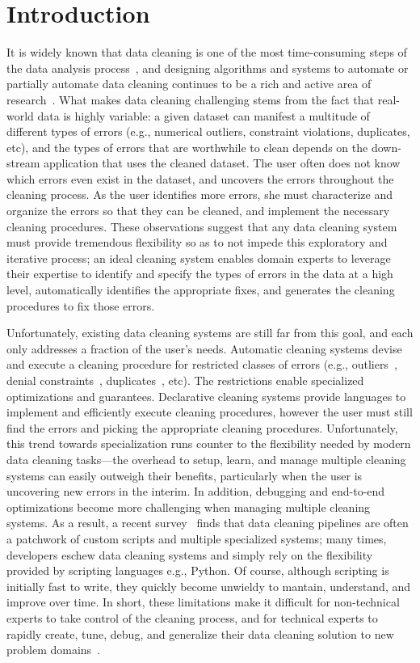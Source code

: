 \section{Introduction}\label{intro}\sloppy
It is widely known that data cleaning is one of the most time-consuming steps of the data analysis process~\cite{nytimes}, and
designing algorithms and systems to automate or partially automate data cleaning continues to be a rich and active area of research~\cite{DBLP:conf/sigmod/ChuIKW16}.
What makes data cleaning challenging stems from the fact that real-world data is highly variable: a given dataset can manifest a multitude of different types of errors (e.g., numerical outliers, constraint violations, duplicates, etc), and the types of errors that are worthwhile to clean depends on the down-stream application that uses the cleaned dataset.  The user often does not know which errors even exist in the dataset, and uncovers the errors throughout the cleaning process.
As the user identifies more errors, she must characterize and organize the errors so that they can be cleaned, and implement the necessary cleaning procedures.
These observations suggest that any data cleaning system must provide tremendous flexibility so as to not impede this exploratory and iterative process; an ideal cleaning system enables domain experts to leverage their expertise to identify and specify the types of errors in the data at a high level, automatically identifies the appropriate fixes, and generates the cleaning procedures to fix those errors.  

Unfortunately, existing data cleaning systems are still far from this goal, and each only addresses a fraction of the user's needs.
Automatic cleaning systems devise and execute a cleaning procedure for restricted classes of errors (e.g., outliers~\cite{}, denial constraints~\cite{}, duplicates~\cite{}, etc).  The restrictions enable specialized optimizations and guarantees.  
Declarative cleaning systems provide languages to implement and efficiently execute cleaning procedures, however the user must still find the errors and picking the appropriate cleaning procedures.
Unfortunately, this trend towards specialization runs counter to the flexibility needed by modern data cleaning tasks---the overhead to setup, learn, and manage multiple  cleaning systems can easily outweigh their benefits, particularly when the user is uncovering new errors in the interim.    In addition, debugging and end-to-end optimizations become more challenging when managing multiple cleaning systems.
As a result, a recent survey~\cite{krishnan2016hilda} finds that data cleaning pipelines are often a patchwork of custom scripts and multiple specialized systems; many times, developers eschew data cleaning systems and simply rely on the flexibility provided by scripting languages e.g., Python.  Of course, although scripting is initially fast to write, they quickly become unwieldy to mantain, understand, and improve over time.  
In short, these limitations make it difficult for non-technical experts to take control of the cleaning process, and for technical experts to rapidly create, tune, debug, and generalize their data cleaning solution to new problem domains~\cite{sculley2014machine,krishnan2016hilda}.




